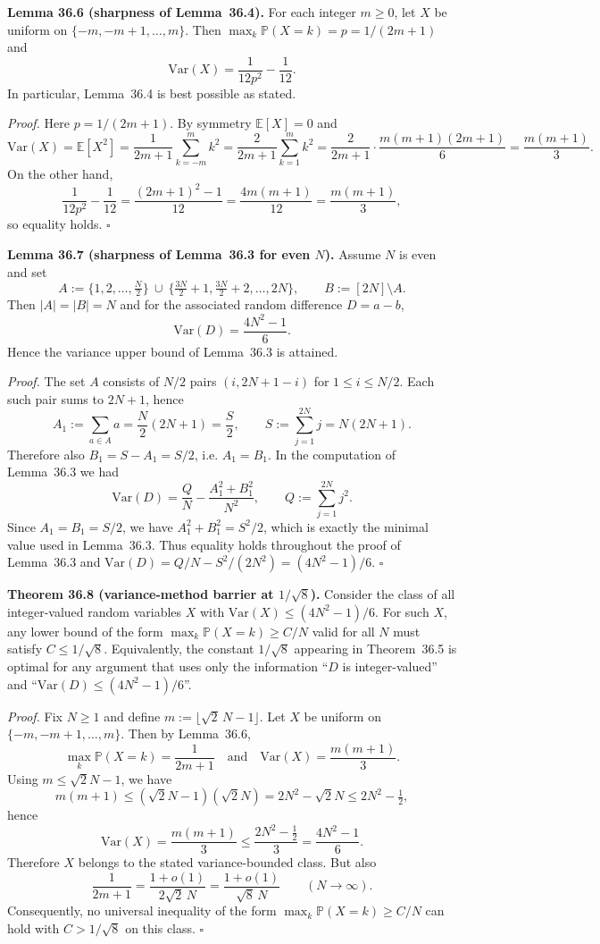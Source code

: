 \medskip
\noindent\textbf{Lemma 36.6 (sharpness of Lemma~36.4).}
For each integer \(m\ge 0\), let \(X\) be uniform on \(\{-m,-m+1,\dots,m\}\).
Then \(\max_k \mathbb P(X=k)=p=1/(2m+1)\) and
\[
\mathrm{Var}(X)=\frac{1}{12p^2}-\frac{1}{12}.
\]
In particular, Lemma~36.4 is best possible as stated.

\noindent\emph{Proof.}
Here \(p=1/(2m+1)\).
By symmetry \(\mathbb E[X]=0\) and
\[
\mathrm{Var}(X)=\mathbb E[X^2]=\frac{1}{2m+1}\sum_{k=-m}^m k^2
=\frac{2}{2m+1}\sum_{k=1}^m k^2
=\frac{2}{2m+1}\cdot\frac{m(m+1)(2m+1)}{6}
=\frac{m(m+1)}{3}.
\]
On the other hand,
\[
\frac{1}{12p^2}-\frac{1}{12}=\frac{(2m+1)^2-1}{12}=\frac{4m(m+1)}{12}=\frac{m(m+1)}{3},
\]
so equality holds.
\hfill$\square$

\medskip
\noindent\textbf{Lemma 36.7 (sharpness of Lemma~36.3 for even \(N\)).}
Assume \(N\) is even and set
\[
A:=\{1,2,\dots,\tfrac{N}{2}\}\ \cup\ \{\tfrac{3N}{2}+1,\tfrac{3N}{2}+2,\dots,2N\},
\qquad B:=[2N]\setminus A.
\]
Then \(|A|=|B|=N\) and for the associated random difference \(D=a-b\),
\[
\mathrm{Var}(D)=\frac{4N^2-1}{6}.
\]
Hence the variance upper bound of Lemma~36.3 is attained.

\noindent\emph{Proof.}
The set \(A\) consists of \(N/2\) pairs
\((i,2N+1-i)\) for \(1\le i\le N/2\).
Each such pair sums to \(2N+1\), hence
\[
A_1:=\sum_{a\in A} a=\frac{N}{2}(2N+1)=\frac{S}{2},
\qquad S:=\sum_{j=1}^{2N} j = N(2N+1).
\]
Therefore also \(B_1=S-A_1=S/2\), i.e. \(A_1=B_1\).
In the computation of Lemma~36.3 we had
\[
\mathrm{Var}(D)=\frac{Q}{N}-\frac{A_1^2+B_1^2}{N^2},
\qquad Q:=\sum_{j=1}^{2N} j^2.
\]
Since \(A_1=B_1=S/2\), we have \(A_1^2+B_1^2=S^2/2\), which is exactly the minimal value used in Lemma~36.3.
Thus equality holds throughout the proof of Lemma~36.3 and
\(\mathrm{Var}(D)=Q/N-S^2/(2N^2)=(4N^2-1)/6\).
\hfill$\square$

\medskip
\noindent\textbf{Theorem 36.8 (variance-method barrier at \(1/\sqrt 8\)).}
Consider the class of all integer-valued random variables \(X\) with
\(\mathrm{Var}(X)\le (4N^2-1)/6\).
For such \(X\), any lower bound of the form
\(\max_k \mathbb P(X=k)\ge C/N\) valid for all \(N\) must satisfy
\(C\le 1/\sqrt 8\).
Equivalently, the constant \(1/\sqrt 8\) appearing in Theorem~36.5 is optimal for any argument that uses only the information ``\(D\) is integer-valued'' and ``\(\mathrm{Var}(D)\le (4N^2-1)/6\)''.

\noindent\emph{Proof.}
Fix \(N\ge 1\) and define
\(m:=\lfloor \sqrt{2}\,N-1\rfloor\).
Let \(X\) be uniform on \(\{-m,-m+1,\dots,m\}\).
Then by Lemma~36.6,
\[
\max_k \mathbb P(X=k)=\frac{1}{2m+1}
\quad\text{and}\quad
\mathrm{Var}(X)=\frac{m(m+1)}{3}.
\]
Using \(m\le \sqrt{2}N-1\), we have
\[
 m(m+1)\le (\sqrt{2}N-1)(\sqrt{2}N)=2N^2-\sqrt{2}N\le 2N^2-\tfrac12,
\]
hence
\[
\mathrm{Var}(X)=\frac{m(m+1)}{3}\le \frac{2N^2-\tfrac12}{3}=\frac{4N^2-1}{6}.
\]
Therefore \(X\) belongs to the stated variance-bounded class. But also
\[
\frac{1}{2m+1}=\frac{1+o(1)}{2\sqrt{2}\,N}=\frac{1+o(1)}{\sqrt{8}\,N}
\qquad (N\to\infty).
\]
Consequently, no universal inequality of the form
\(\max_k \mathbb P(X=k)\ge C/N\)
can hold with \(C>1/\sqrt 8\) on this class.
\hfill$\square$

